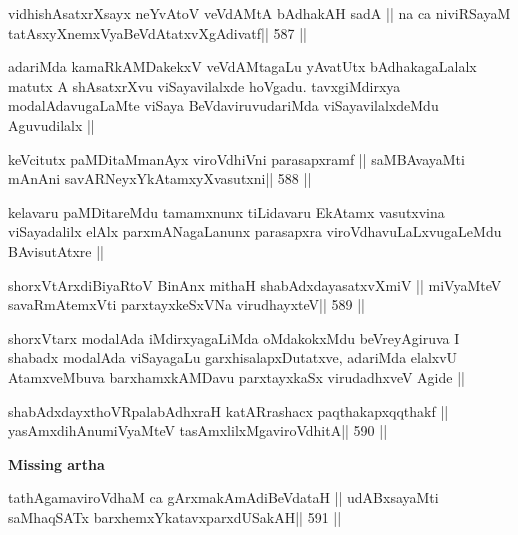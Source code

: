 \begin{shl}
vidhishAsatxrXsayx neYvAtoV veVdAMtA bAdhakAH sadA ||
na ca niviRSayaM tatAsxyXnemxVyaBeVdAtatxvXgAdivatf\hfill || 587 ||
\end{shl}

\begin{artha}
adariMda kamaRkAMDakekxV veVdAMtagaLu yAvatUtx bAdhakagaLalalx matutx A
shAsatxrXvu viSayavilalxde hoVgadu. tavxgiMdirxya modalAdavugaLaMte
viSaya BeVdaviruvudariMda viSayavilalxdeMdu Aguvudilalx ||
\end{artha}


\begin{shl}
keVcitutx paMDitaMmanAyx viroVdhiVni parasapxramf ||
saMBAvayaMti mAnAni savARNeyxYkAtamxyXvasutxni\hfill || 588 ||
\end{shl}

\begin{artha}
kelavaru paMDitareMdu tamamxnunx tiLidavaru EkAtamx vasutxvina viSayadalilx elAlx parxmANagaLanunx parasapxra
viroVdhavuLaLxvugaLeMdu BAvisutAtxre ||
\end{artha}



\begin{shl}
shorxVtArxdiBiyaRtoV BinAnx mithaH shabAdxdayasatxvXmiV ||
miVyaMteV savaRmAtemxVti parxtayxkeSxVNa virudhayxteV\hfill || 589 ||
\end{shl}

\begin{artha}
shorxVtarx modalAda iMdirxyagaLiMda oMdakokxMdu beVreyAgiruva I
shabadx modalAda viSayagaLu garxhisalapxDutatxve, adariMda elalxvU
AtamxveMbuva barxhamxkAMDavu parxtayxkaSx virudadhxveV Agide ||
\end{artha}



\begin{shl}
shabAdxdayxthoVRpalabAdhxraH katARrashacx paqthakapxqqthakf ||
yasAmxdihAnumiVyaMteV tasAmxlilxMgaviroVdhitA\hfill || 590 ||
\end{shl}

\medskip
{\Large{\rm{\textbf{Missing artha}}}}

\medskip

\begin{shl}
tathA\s\s gamaviroVdhaM ca gArxmakAmAdiBeVdataH ||
udABxsayaMti saMhaqSATx barxhemxYkatavxparxdUSakAH\hfill || 591 ||
\end{shl}


